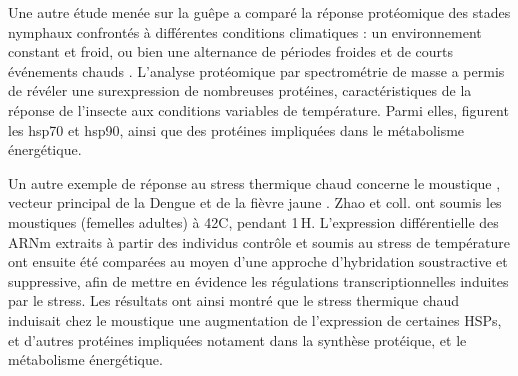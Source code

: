 		Une autre étude menée sur la guêpe  a comparé la réponse protéomique des stades nymphaux confrontés à différentes conditions climatiques : un environnement constant et froid, ou bien une alternance de périodes froides et de courts événements chauds \cite{colinet2007}.
		L'analyse protéomique par spectrométrie de masse a  permis de révéler une surexpression de nombreuses protéines, caractéristiques de la réponse de l'insecte aux conditions variables de température. Parmi elles, figurent les hsp70 et hsp90,
		ainsi que des protéines impliquées dans le métabolisme énergétique.


		Un autre exemple de réponse au stress thermique chaud concerne le moustique , vecteur principal de la Dengue et de la fièvre jaune \cite{zhao2009}. Zhao et coll. ont soumis les moustiques (femelles adultes) à 42\textdegree{}C, pendant 1\,H.
		L'expression différentielle des ARNm extraits à partir des individus contrôle et soumis au stress de température ont ensuite été comparées au moyen d'une approche d'hybridation soustractive et suppressive, afin de mettre en évidence les régulations transcriptionnelles induites par le stress.
		Les résultats ont ainsi montré que le stress thermique chaud induisait chez le moustique
		une augmentation de l'expression de certaines HSPs, et d'autres protéines impliquées notament dans la synthèse protéique, et le métabolisme énergétique.

